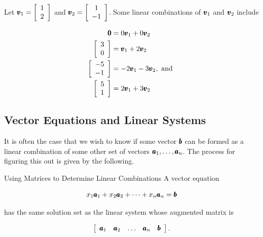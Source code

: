 \begin{example}
    Let $\pmb{v}_1 = \left[\begin{array}{l}
        1 \\
        2
        \end{array}\right]$ and $\pmb{v}_2 = \left[\begin{array}{c}
        1 \\
        -1
        \end{array}\right]$. Some linear combinations of $\pmb{v}_1$ and $\pmb{v}_2$ include
        
        \[
        \begin{aligned}
        \pmb{0} & = 0 \pmb{v}_1 + 0 \pmb{v}_2 \\
        {\left[\begin{array}{l}
        3 \\
        0
        \end{array}\right] } & = \pmb{v}_1 + 2 \pmb{v}_2 \\
        {\left[\begin{array}{l}
        -5 \\
        -1
        \end{array}\right] } & = -2 \pmb{v}_1 - 3 \pmb{v}_2, \text { and } \\
        {\left[\begin{array}{l}
        5 \\
        1
        \end{array}\right] } & = 2 \pmb{v}_1 + 3 \pmb{v}_2
        \end{aligned}
        \]
        
\end{example}

\subsection*{Vector Equations and Linear Systems}

It is often the case that we wish to know if some vector $\pmb{b}$ can be formed as a linear combination of some other set of vectors $\pmb{a}_1, \ldots, \pmb{a}_n$. The process for figuring this out is given by the following.

\begin{custombox}{Using Matrices to Determine Linear Combinations}
A vector equation

\[
x_1 \pmb{a}_1 + x_2 \pmb{a}_2 + \cdots + x_n \pmb{a}_n = \pmb{b}
\]

has the same solution set as the linear system whose augmented matrix is

\[
\left[\begin{array}{lllll}
\pmb{a}_1 & \pmb{a}_2 & \ldots & \pmb{a}_n & \pmb{b}
\end{array}\right].
\]    
\end{custombox}

